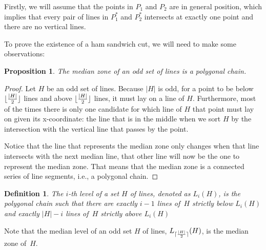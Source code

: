 \documentclass{article}
\DeclarePairedDelimiter\ceil{\lceil}{\rceil}
\DeclarePairedDelimiter\floor{\lfloor}{\rfloor}
\newtheorem{definition}{Definition}
\newtheorem{proposition}{Proposition}
\begin{document}
Firstly, we will assume that the points in $P_1$ and $P_2$ are in general position, which implies that every pair of lines in $P_1^*$ and $P_2^*$ intersects at exactly one point and there are no vertical lines.  %

To prove the existence of a ham sandwich cut, we will need to make some observations:

\begin{proposition}
\label{median_level_preposition}
The median zone of an odd set of lines is a polygonal chain.
\end{proposition}
\begin{proof}
Let $H$ be an odd set of lines.
Because $|H|$ is odd, for a point to be below $\floor{\frac{|H|}{2}}$ lines and above $\floor{\frac{|H|}{2}}$ lines, it must lay on a line of $H$. Furthermore, most of the times there is only one candidate for which line of $H$ that point must lay on given its x-coordinate: the line that is in the middle when we sort $H$ by the intersection with the vertical line that passes by the point.

Notice that the line that represents the median zone only changes when that line intersects with the next median line, that other line will now be the one to represent the median zone.
That means that the median zone is a connected series of line segments, i.e., a polygonal chain.
\end{proof}

\begin{definition}\label{level_definition}
  The $i$-th level of a set $H$ of lines, denoted as $L_i(H)$, is the polygonal chain such that there are exactly $i-1$ lines of~$H$ strictly below $L_i(H)$ and exactly $|H|-i$ lines of~$H$ strictly above $L_i(H)$
\end{definition}

Note that the median level of an odd set $H$ of lines, $L_{\ceil{\frac{|H|}{2}}}(H)$, is the median zone of~$H$.
\end{document}
